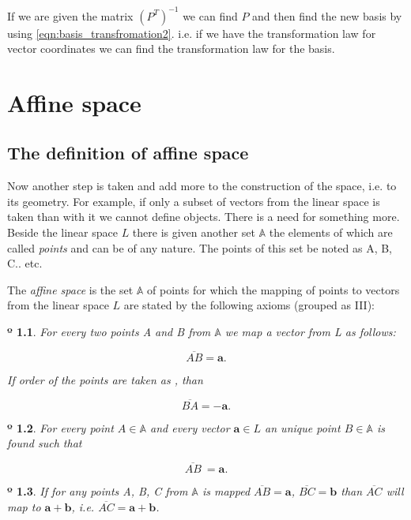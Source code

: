 \documentclass{book}
\newtheorem{axiom}{º}
\begin{document}
If we are given the matrix $(P^T)^{-1}$ we can find $P$ and then find the new basis by using \eqref{eqn:basis_transfromation2}. i.e. if we have the transformation law for vector coordinates we can find the transformation law for the basis.

\chapter{Affine space}

\section{The definition of affine space}
Now another step is taken and add more to the construction of the space,
i.e. to its geometry. For example, if only a subset of vectors from the linear space
is taken than with it we cannot define objects. There is a need for something more.
Beside the linear space $L$ there is given another set $\mathbb{A}$ the elements of which are called \emph{points} and can be of any nature. The points of this set be noted as A, B, C.. etc.

The \emph{affine space} is the set $\mathbb{A}$ of points for which the mapping of points to vectors from the linear space $L$ are stated by the following axioms (grouped as III):

\begin{axiom}
For every two points A and B from $\mathbb{A}$ we map a vector  from L as follows:

\[\overline{AB} = \boldsymbol{a}.\]

If order of the points are taken as , than

\[\overline{BA} = -\boldsymbol{a}.\]
\end{axiom}

\begin{axiom}
For every point $A \in \mathbb{A}$ and every vector $\boldsymbol{a} \in L$ an unique point $B \in \mathbb{A}$ is found such that

\[\overline{AB}\ = \boldsymbol{a}.\]

\end{axiom}

\begin{axiom}
If for any points A, B, C from $\mathbb{A}$ is mapped $\overline{AB} = \boldsymbol{a}$, $\overline{BC} = \boldsymbol{b}$ than $\overline{AC}$ will map to $\boldsymbol{a} + \boldsymbol{b}$, i.e.  $\overline{AC} = \boldsymbol{a} + \boldsymbol{b}$.
\end{axiom}
\end{document}
